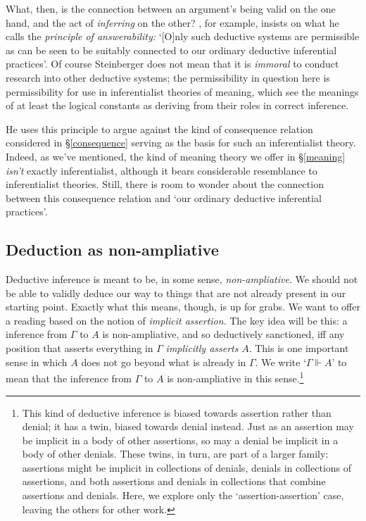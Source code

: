 \documentclass{article}
\newcommand{\G}{\ensuremath{\Gamma}}
\newcommand{\ded}{\Vdash}
\begin{document}
What, then, is the connection between an argument's being valid on the one hand, and the act of {\em inferring} on the other?
\cite{steinberger:wcsrs}, for example, insists on what he calls the {\em principle of answerability:} `[O]nly such deductive systems are permissible as can be seen to be suitably connected to our ordinary deductive inferential practices'.
Of course Steinberger does not mean that it is {\em immoral} to conduct research into other deductive systems; the permissibility in question here is permissibility for use in inferentialist theories of meaning, which see the meanings of at least the logical constants as deriving from their roles in correct inference.

He uses this principle to argue against the kind of consequence relation considered in \S\ref{consequence} serving as the basis for such an inferentialist theory.
Indeed, as we've mentioned, the kind of meaning theory we offer in \S\ref{meaning} {\em isn't} exactly inferentialist, although it bears considerable resemblance to inferentialist theories.
Still, there is room to wonder about the connection between this consequence relation and `our ordinary deductive inferential practices'.

\subsection{Deduction as non-ampliative}

Deductive inference is meant to be, in some sense, {\em non-ampliative}.
We should not be able to validly deduce our way to things that are not already present in our starting point.
Exactly what this means, though, is up for grabs.
We want to offer a reading based on the notion of {\em implicit assertion}.
The key idea will be this: a inference from $\G$ to $A$ is non-ampliative, and so deductively sanctioned, iff any position that asserts everything in $\G$ {\em implicitly asserts} $A$.
This is one important sense in which $A$ does not go beyond what is already in $\G$.
We write `$\G \ded A$' to mean that the inference from $\G$ to $A$ is non-ampliative in this sense.\footnote{This kind of deductive inference is biased towards assertion rather than denial; it has a twin, biased towards denial instead. 
Just as an assertion may be implicit in a body of other assertions, so may a denial be implicit in a body of other denials. 
These twins, in turn, are part of a larger family: assertions might be implicit in collections of denials, denials in collections of assertions, and both assertions and denials in collections that combine assertions and denials.
Here, we explore only the `assertion-assertion' case, leaving the others for other work.}
\end{document}
